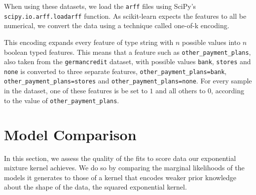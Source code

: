 \documentclass[a4paper,12pt,twoside,openright]{report}
\begin{document}
When using these datasets, we load the \texttt{arff} files using SciPy's \texttt{scipy.io.arff.loadarff} function. As scikit-learn expects the features to all be numerical, we convert the data using a technique called one-of-k encoding.


This encoding expands every feature of type string with $n$ possible values into $n$ boolean typed features. This means that a feature such as \texttt{other\_payment\_plans}, also taken from the \texttt{germancredit} dataset, with possible values \texttt{bank}, \texttt{stores} and \texttt{none} is converted to three separate features, \texttt{other\_payment\_plans=bank}, \texttt{other\_payment\_plans=stores} and \texttt{other\_payment\_plans=none}. For every sample in the dataset, one of these features is be set to $1$ and all others to $0$, according to the value of \texttt{other\_payment\_plans}.


\section{Model Comparison}
In this section, we assess the quality of the fits to score data our exponential mixture kernel achieves. We do so by comparing the marginal likelihoods of the models it generates to those of a kernel that encodes weaker prior knowledge about the shape of the data, the squared exponential kernel.







\end{document}
